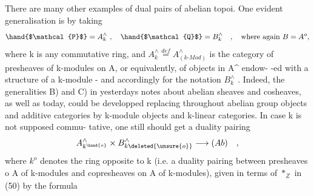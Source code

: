 There are many other examples of dual pairs of abelian topoi.  One evident
generalisation is by   taking
\[ \hand{$\mathcal{P}$} = A^{\wedge}_{k} \ , \quad \hand{$\mathcal{Q}$} = B^{\wedge}_{k} \quad , \quad \text{where again } B=A^{o} , \]
where k is any commutative ring,  and  $A^{\wedge}_{k} \overset{def}{=} A^{\wedge}_{(k\text{-}Mod)}$  is the category
of presheaves of k-modules on A,  or equivalently,  of objects in A\^{} endow-%
-ed with a structure of a k-module  -  and accordingly for the notation
$B^{\wedge}_{k}$ .  Indeed,  the generalities B) and C)  in yesterdays notes about
abelian sheaves and cosheaves,  as well as today, could be developped
replacing throughout abelian group objects and additive categories by
k-module objects and k-linear categories.  In case k is not supposed commu-%
tative,  one still should get a duality pairing
\[ A^{\wedge}_{k^{\hand{o}}} \times B^{\wedge}_{k\deleted{\unsure{o}}} \longrightarrow (Ab) \quad , \]
where $k^{o}$ denotes the ring opposite to k  (i.e.   a duality pairing
between presheaves o A of  k-modules\hand{,} and copresheaves on A of 
k-modules),  given in terms of  $*_{\underline{Z}}$  in (50)  by the formula

